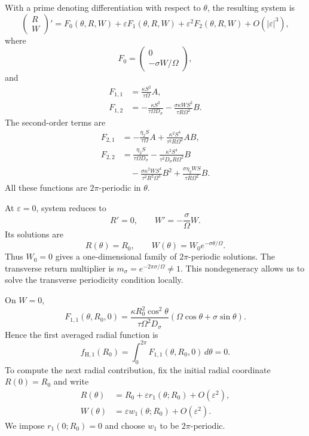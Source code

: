 \documentclass[11pt,reqno]{amsart}
\theoremstyle{plain}
\theoremstyle{definition}
\theoremstyle{remark}
\begin{document}
With a prime denoting differentiation with respect to
$\theta$, the resulting system is
\[
\begin{pmatrix}R\\W\end{pmatrix}'
=
F_0(\theta,R,W)
+\varepsilon F_1(\theta,R,W)
+\varepsilon^2F_2(\theta,R,W)
+O(|\varepsilon|^3),
\]
where
\[
\label{eq:F0-classical}
F_0=
\begin{pmatrix}0\\-\sigma W/\Omega\end{pmatrix},
\]
and
\[
\begin{aligned}
F_{1,1}
&=\frac{\kappa S^2}{\tau\Omega}A,\\
F_{1,2}
&=-\frac{\kappa S^2}{\tau\Omega D_\sigma}
-\frac{\sigma\kappa WS^2}{\tau R\Omega^2}B.
\end{aligned}
\]
The second-order terms are
\[
\begin{aligned}
F_{2,1}
&=
-\frac{\eta_2 S}{\tau\Omega}A
+\frac{\kappa^2S^4}{\tau^2R\Omega^2}AB,\\
F_{2,2}
&=
\frac{\eta_2 S}{\tau\Omega D_\sigma}
-\frac{\kappa^2S^4}{\tau^2D_\sigma R\Omega^2}B\\
&\quad
-\frac{\sigma\kappa^2WS^4}{\tau^2R^2\Omega^3}B^2
+\frac{\sigma\eta_2WS}{\tau R\Omega^2}B.
\end{aligned}
\]
All these functions are $2\pi$-periodic in $\theta$.

At $\varepsilon=0$, system reduces to
\[
R'=0,\qquad W'=-\frac{\sigma}{\Omega}W.
\]
Its solutions are
\[
R(\theta)=R_0,\qquad
W(\theta)=W_0e^{-\sigma\theta/\Omega}.
\]
Thus $W_0=0$ gives a one-dimensional family of
$2\pi$-periodic solutions. The transverse return multiplier is
$
m_\sigma=e^{-2\pi\sigma/\Omega}\neq1.
$
This nondegeneracy allows us to solve the transverse
periodicity condition locally.

On $W=0$,
\[
F_{1,1}(\theta,R_0,0)
=
\frac{\kappa R_0^2\cos^2\theta}
{\tau\Omega^2D_\sigma}
\left(\Omega\cos\theta+\sigma\sin\theta\right).
\]
Hence the first averaged radial function is
\begin{equation}
\label{eq:classical-first-average-vanishes}
f_{\mathrm H,1}(R_0)
=
\int_0^{2\pi}F_{1,1}(\theta,R_0,0)\,d\theta
=0.
\end{equation}
To compute the next radial contribution, fix the initial
radial coordinate $R(0)=R_0$ and write
\[
\begin{aligned}
R(\theta)&=R_0+\varepsilon r_1(\theta;R_0)
+O(\varepsilon^2),\\
W(\theta)&=\varepsilon w_1(\theta;R_0)
+O(\varepsilon^2).
\end{aligned}
\]
We impose $r_1(0;R_0)=0$ and choose $w_1$ to be
$2\pi$-periodic.
\end{document}
